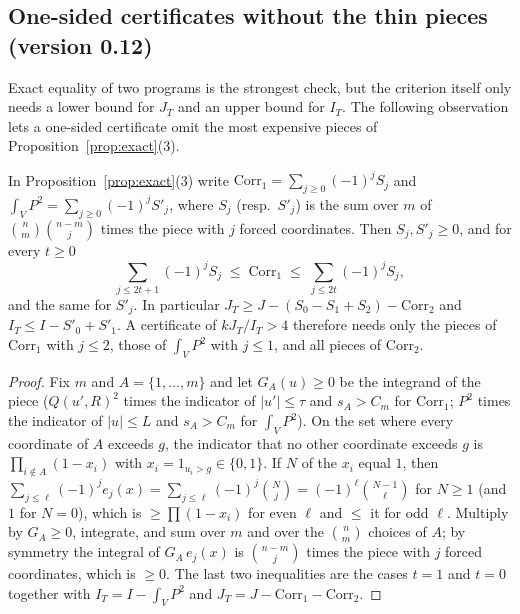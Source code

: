 \subsection*{One-sided certificates without the thin pieces (version 0.12)}
Exact equality of two programs is the strongest check, but the criterion
itself only needs a lower bound for $J_T$ and an upper bound for $I_T$. The
following observation lets a one-sided certificate omit the most expensive
pieces of Proposition~\ref{prop:exact}(3).

\begin{proposition}\label{prop:bonf}
In Proposition~\ref{prop:exact}(3) write $\mathrm{Corr}_1=\sum_{j\ge0}(-1)^jS_j$
and $\int_VP^2=\sum_{j\ge0}(-1)^jS'_j$, where $S_j$ (resp.\ $S'_j$) is the sum
over $m$ of $\binom nm\binom{n-m}{j}$ times the piece with $j$ forced
coordinates. Then $S_j,S'_j\ge0$, and for every $t\ge0$
\[
\sum_{j\le 2t+1}(-1)^jS_j\;\le\;\mathrm{Corr}_1\;\le\;\sum_{j\le2t}(-1)^jS_j,
\]
and the same for $S'_j$. In particular
$J_T\ge J-\left(S_0-S_1+S_2\right)-\mathrm{Corr}_2$ and
$I_T\le I-S'_0+S'_1$. A certificate of $kJ_T/I_T>4$ therefore needs only
the pieces of $\mathrm{Corr}_1$ with $j\le2$, those of $\int_VP^2$ with
$j\le1$, and all pieces of $\mathrm{Corr}_2$.
\end{proposition}

\begin{proof}
Fix $m$ and $A=\{1,\dots,m\}$ and let $G_A(u)\ge0$ be the integrand of the
piece ($Q(u',R)^2$ times the indicator of $|u'|\le\tau$ and $s_A>C_m$ for
$\mathrm{Corr}_1$; $P^2$ times the indicator of $|u|\le L$ and $s_A>C_m$ for
$\int_VP^2$). On the set where every coordinate of $A$ exceeds $g$, the
indicator that no other coordinate exceeds $g$ is $\prod_{i\notin A}(1-x_i)$
with $x_i=1_{u_i>g}\in\{0,1\}$. If $N$ of the $x_i$ equal $1$, then
$\sum_{j\le\ell}(-1)^je_j(x)=\sum_{j\le\ell}(-1)^j\binom Nj=(-1)^\ell\binom{N-1}{\ell}$
for $N\ge1$ (and $1$ for $N=0$), which is $\ge\prod(1-x_i)$ for even $\ell$ and
$\le$ it for odd $\ell$. Multiply by $G_A\ge0$, integrate, and sum over $m$
and over the $\binom nm$ choices of $A$; by symmetry the integral of
$G_A\,e_j(x)$ is $\binom{n-m}{j}$ times the piece with $j$ forced
coordinates, which is $\ge0$. The last two inequalities are the cases $t=1$
and $t=0$ together with $I_T=I-\int_VP^2$ and
$J_T=J-\mathrm{Corr}_1-\mathrm{Corr}_2$.
\end{proof}

